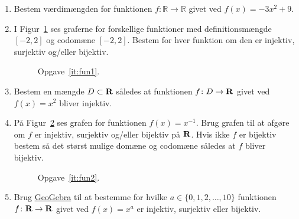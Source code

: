 \begin{enumerate}
	\item Bestem værdimængden for funktionen $f\colon \mathbb{R}\to \mathbb{R}$ givet ved $f(x)=-3x^2+9$.
	
	\item \label{it:fun1} I Figur~\ref{fig:fun1} ses graferne for forskellige funktioner med definitionsmængde $[-2,2]$ og codomæne $[-2,2]$. Bestem for hver funktion om den er injektiv, surjektiv og/eller bijektiv.
	\begin{figure}
		\centering
	\caption{Opgave~\ref{it:fun1}.}
	\label{fig:fun1}
	\end{figure}

	\item Bestem en mængde $D\subset \mathbf{R}$ således at funktionen $f\colon D\to \mathbf{R}$ givet ved $f(x)=x^2$ bliver injektiv.
	
	\item \label{it:fun2} På Figur~\ref{fig:fun2} ses grafen for funktionen $f(x)=x^{-1}$. Brug grafen til at afgøre om $f$ er injektiv, surjektiv og/eller bijektiv på $\mathbf{R}$. Hvis ikke $f$ er bijektiv bestem så det størst mulige domæne og codomæne således at $f$ bliver bijektiv.
	
	\begin{figure}
		\centering
		\caption{Opgave~\ref{it:fun2}.}
		\label{fig:fun2}
	\end{figure}

	\item Brug \href{https://www.geogebra.org/m/eEE7RXzU}{GeoGebra} til at bestemme for hvilke $a\in \{0,1,2,\dots,10\}$ funktionen $f\colon \mathbf{R}\to \mathbf{R}$ givet ved $f(x)=x^a$ er injektiv, surjektiv eller bijektiv. 
	

\end{enumerate}
